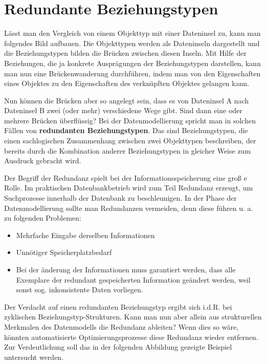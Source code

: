       \section{Redundante Beziehungstypen}
        Lässt man den Vergleich von einem Objekttyp mit einer Dateninsel zu, kann man folgendes Bild aufbauen. Die Objekttypen werden als Dateninseln dargestellt und die Beziehungstypen bilden die Brücken zwischen diesen Inseln. Mit Hilfe der Beziehungen, die ja konkrete Ausprägungen der Beziehungstypen darstellen, kann man nun eine Brückenwanderung durchführen, indem man von den Eigenschaften eines Objektes zu den Eigenschaften des verknüpften Objektes gelangen kann.

        Nun können die Brücken aber so angelegt sein, dass es von Dateninsel A nach Dateninsel B zwei (oder mehr) verschiedene Wege gibt. Sind dann eine oder mehrere Brücken überflüssig? Bei der Datenmodellierung spricht man in solchen Fällen von \textbf{redundanten Beziehungstypen}. Das sind Beziehungstypen, die einen sachlogischen Zusammenhang zwischen zwei Objekttypen beschreiben, der bereits durch die Kombination anderer Beziehungstypen in gleicher Weise zum Ausdruck gebracht wird.

        Der Begriff der Redundanz spielt bei der Informationsspeicherung eine groß e Rolle. Im praktischen Datenbankbetrieb wird zum Teil Redundanz erzeugt, um Suchprozesse innerhalb der Datenbank zu beschleunigen. In der Phase der Datenmodellierung sollte man Redundanzen vermeiden, denn diese führen u. a. zu folgenden Problemen:
        \begin{itemize}
          \item Mehrfache Eingabe derselben Informationen
          \item Unnötiger Speicherplatzbedarf
          \item Bei der änderung der Informationen muss garantiert werden, dass alle Exemplare der redundant gespeicherten Information geändert werden, weil sonst sog. inkonsistente Daten vorliegen.
        \end{itemize}

        Der Verdacht auf einen redundanten Beziehungstyp ergibt sich i.d.R. bei zyklischen Be\-zieh\-ungs\-typ-Struk\-turen. Kann man nun aber allein aus strukturellen Merkmalen des Datenmodells die Redundanz ableiten? Wenn dies so wäre, könnten automatisierte Optimierungsprozesse diese Redundanz wieder entfernen. Zur Verdeutlichung soll das in der folgenden Abbildung gezeigte Beispiel untersucht werden.

